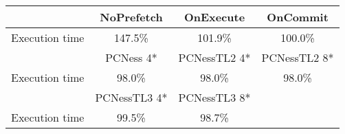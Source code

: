 \begin{tabular}{ l|ccc }
 & NoPrefetch & OnExecute & OnCommit\\ \hline
Execution time & 147.5\% & 101.9\% & 100.0\%\\ \hline
\hline
 & PCNess 4* & PCNessTL2 4* & PCNessTL2 8*\\ \hline
Execution time & 98.0\% & 98.0\% & 98.0\%\\ \hline
\hline
 & PCNessTL3 4* & PCNessTL3 8*&\\ \hline
Execution time & 99.5\% & 98.7\%&\\ \hline
\end{tabular}

